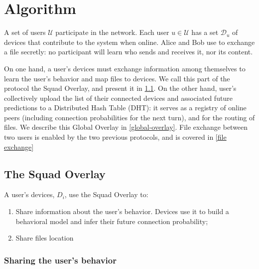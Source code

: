 \section{Algorithm}%
\label{Algorithm}


\newcommand{\Alice}{\ensuremath{\mathscr{A}}}
\newcommand{\Bob}{\ensuremath{\mathscr{B}}}

\newcommand{\localoverlay}{Squad Overlay\xspace}
\newcommand{\globaloverlay}{Global Overlay\xspace}


A set of users $\mathcal{U}$ participate in the \name network.
Each user $u \in \mathcal{U}$ has a set $\mathcal{D}_u$ of devices that contribute to the system when online.
Alice and Bob use \name to exchange a file secretly: no participant will learn who sends and receives it, nor its content.

On one hand, a user's devices must exchange information among themselves to learn the user's behavior  and map files to devices.
We call this part of the protocol the \localoverlay, and present it in 
\cref{local-overlay}. On the other hand, user's collectively upload the list of 
their connected devices and associated future predictions to a Distributed Hash 
Table (DHT): it serves as a registry of online peers (including connection 
probabilities for the next turn), and for the routing of files.
We describe this \globaloverlay in \cref{global-overlay}. File exchange between 
two users is enabled by the two previous protocols, and is covered in \cref{file 
  exchange}

\subsection{The \localoverlay}%
\label{local-overlay}

A user's devices, \(D_i\), use the \localoverlay to:
\begin{enumerate}
	\item Share information about the user's behavior.
	Devices use it to build a behavioral model and infer their future connection probability;
  \item Share files location 
\end{enumerate}

\subsubsection{Sharing the user's behavior}%
\label{ssub:sharing_the_user_s_behavior}

